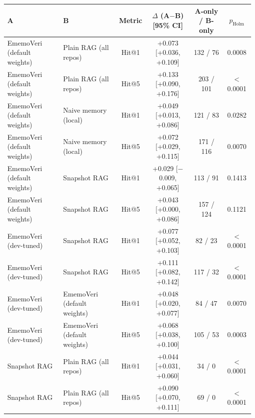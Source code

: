 \begin{tabular}{llcccc}
\toprule
A & B & Metric & $\Delta$ (A$-$B) [95\% CI] & A-only / B-only & $p_{\text{Holm}}$ \\
\midrule
EmemoVeri (default weights) & Plain RAG (all repos) & Hit@1 & +0.073 [+0.036, +0.109] & 132 / 76 & 0.0008 \\
EmemoVeri (default weights) & Plain RAG (all repos) & Hit@5 & +0.133 [+0.090, +0.176] & 203 / 101 & $<$0.0001 \\
\midrule
EmemoVeri (default weights) & Naive memory (local) & Hit@1 & +0.049 [+0.013, +0.086] & 121 / 83 & 0.0282 \\
EmemoVeri (default weights) & Naive memory (local) & Hit@5 & +0.072 [+0.029, +0.115] & 171 / 116 & 0.0070 \\
\midrule
EmemoVeri (default weights) & Snapshot RAG & Hit@1 & +0.029 [$-$0.009, +0.065] & 113 / 91 & 0.1413 \\
EmemoVeri (default weights) & Snapshot RAG & Hit@5 & +0.043 [+0.000, +0.086] & 157 / 124 & 0.1121 \\
\midrule
EmemoVeri (dev-tuned) & Snapshot RAG & Hit@1 & +0.077 [+0.052, +0.103] & 82 / 23 & $<$0.0001 \\
EmemoVeri (dev-tuned) & Snapshot RAG & Hit@5 & +0.111 [+0.082, +0.142] & 117 / 32 & $<$0.0001 \\
\midrule
EmemoVeri (dev-tuned) & EmemoVeri (default weights) & Hit@1 & +0.048 [+0.020, +0.077] & 84 / 47 & 0.0070 \\
EmemoVeri (dev-tuned) & EmemoVeri (default weights) & Hit@5 & +0.068 [+0.038, +0.100] & 105 / 53 & 0.0003 \\
\midrule
Snapshot RAG & Plain RAG (all repos) & Hit@1 & +0.044 [+0.031, +0.060] & 34 / 0 & $<$0.0001 \\
Snapshot RAG & Plain RAG (all repos) & Hit@5 & +0.090 [+0.070, +0.111] & 69 / 0 & $<$0.0001 \\
\bottomrule
\end{tabular}